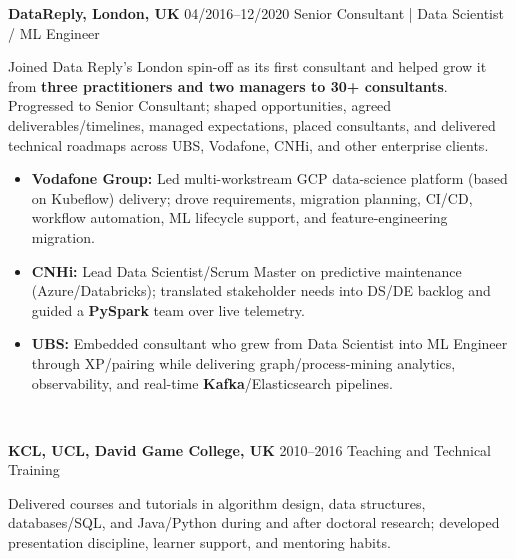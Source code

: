 \documentclass[]{../../../../friggeri-cv}
\renewcommand{\entry}[4]{%
  \parbox[t]{\dimexpr\textwidth-\entryleftinset\relax}{%
    \textbf{#2}%
    {\footnotesize\addfontfeature{Color=lightgray}\hspace{0.6em}#1}%
    \hfill%
    {\small\color{textcolor} #3}\\%
    #4\vspace{\parsep}%
  }\\}
\begin{document}
\begin{entrylist}
{\begin{itemize}[leftmargin=1.1em]
        \end{itemize}
    }
    \entry
    {04/2016--12/2020}
    {DataReply, London, UK}
    {Senior Consultant | Data Scientist / ML Engineer}
    {
        {\normalsize
        \setlength{\parindent}{0pt}
        \setlength{\leftskip}{0pt}
        Joined Data Reply's London spin-off as its first consultant and helped grow it from \textbf{three practitioners and two managers to 30+ consultants}. Progressed to Senior Consultant; shaped opportunities, agreed deliverables/timelines, managed expectations, placed consultants, and delivered technical roadmaps across UBS, Vodafone, CNHi, and other enterprise clients.

        }
        \begin{itemize}[leftmargin=1.1em]
            \item \normalsize\textbf{Vodafone Group:} Led multi-workstream GCP data-science platform (based on Kubeflow) delivery; drove requirements, migration planning, CI/CD, workflow automation, ML lifecycle support, and feature-engineering migration.
            \item \normalsize\textbf{CNHi:} Lead Data Scientist/Scrum Master on predictive maintenance (Azure/Databricks); translated stakeholder needs into DS/DE backlog and guided a \textbf{PySpark} team over live telemetry.
            \item \normalsize\textbf{UBS:} Embedded consultant who grew from Data Scientist into ML Engineer through XP/pairing while delivering graph/process-mining analytics, observability, and real-time \textbf{Kafka}/Elasticsearch pipelines.
        \end{itemize}
    }
    \entry
    {2010--2016}
    {KCL, UCL, David Game College, UK}
    {Teaching and Technical Training}
    {
        {\small
        \setlength{\parindent}{0pt}
        \setlength{\leftskip}{0pt}
        Delivered courses and tutorials in algorithm design, data structures, databases/SQL, and Java/Python during and after doctoral research; developed presentation discipline, learner support, and mentoring habits.

        }
    }
\end{entrylist}
\newpage
\setlength{\parskip}{2pt}
\setlength{\parsep}{0pt}
\end{document}
